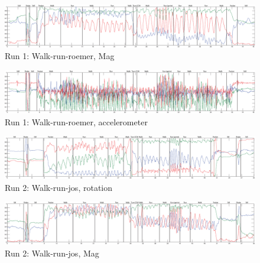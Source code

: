 \begin{figure}
\centering
  \includegraphics[width=1\textwidth]{./Figures/chapter6/data_collection/run-1-walk-run-roemer/data_plot_mag_annotated.eps}
  \caption[R1: mag]{Run 1: Walk-run-roemer, Mag}
  \label{fig:data_gathering_run_1_mag}
\end{figure}

\begin{figure}
\centering
  \includegraphics[width=1\textwidth]{./Figures/chapter6/data_collection/run-1-walk-run-roemer/data_plot_acc_annotated.eps}
  \caption[R1: accelerometer]{Run 1: Walk-run-roemer, accelerometer}
  \label{fig:data_gathering_run_1_ann}
\end{figure}

\begin{figure}
\centering
  \includegraphics[width=1\textwidth]{./Figures/chapter6/data_collection/run-2-walk-run-jos/data_plot_rot_annotated.eps}
  \caption[R2: rotation]{Run 2: Walk-run-jos, rotation}
  \label{fig:data_gathering_run_2_rot}
\end{figure}

\begin{figure}
\centering
  \includegraphics[width=1\textwidth]{./Figures/chapter6/data_collection/run-2-walk-run-jos/data_plot_mag_annotated.eps}
  \caption[R2: mag]{Run 2: Walk-run-jos, Mag}
  \label{fig:data_gathering_run_2_mag}
\end{figure}

